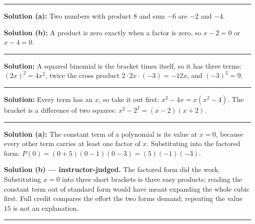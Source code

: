 \documentclass[12pt]{article}
\begin{document}
\vspace{0.15cm}\noindent\rule{\linewidth}{0.2pt}


\textbf{Solution (a):} \quad Two numbers with product $8$ and sum $-6$ are $-2$ and $-4$.

\noindent\textbf{Solution (b):} \quad A product is zero exactly when a factor is zero, so
$x - 2 = 0$ or $x - 4 = 0$. 

\vspace{0.15cm}\noindent\rule{\linewidth}{0.2pt}


\textbf{Solution:} \quad A squared binomial is the bracket times itself, so it has three terms:
$(2x)^2 = 4x^2$, twice the cross product $2\cdot 2x\cdot(-3) = -12x$, and $(-3)^2 = 9$.

\vspace{0.15cm}\noindent\rule{\linewidth}{0.2pt}


\textbf{Solution:} \quad Every term has an $x$, so take it out first: $x^3 - 4x = x(x^2 - 4)$.
The bracket is a difference of two squares: $x^2 - 2^2 = (x - 2)(x + 2)$.

\vspace{0.15cm}\noindent\rule{\linewidth}{0.2pt}


\textbf{Solution (a):} \quad The constant term of a polynomial is its value at $x = 0$, because
every other term carries at least one factor of $x$. Substituting into the factored form:
$P(0) = (0+5)(0-1)(0-3) = (5)(-1)(-3)$. 

\noindent\textbf{Solution (b) --- instructor-judged.} The factored form did the work. Substituting
$x = 0$ into three short brackets is three easy products; reading the constant term out of standard
form would have meant expanding the whole cubic first. Full credit compares the effort the two
forms demand; repeating the value $15$ is not an explanation.

\vspace{0.15cm}\noindent\rule{\linewidth}{0.2pt}

\end{document}
